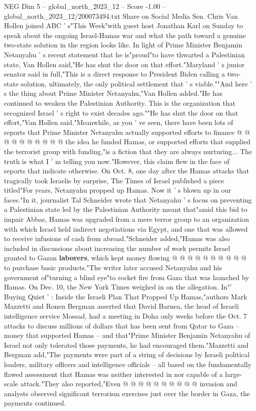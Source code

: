 \begin{textsample}{NEG Dim 5 – global\_north\_2023\_12 – Score -1.00 – global\_north\_2023\_12/200073494.txt}  \label{ex:f5_neg_052}
Share on Social Media Sen.
Chris Van Hollen joined ABC ' s"This Week"with guest host Jonathan Karl on Sunday to speak about the ongoing Israel-Hamas war and what the path toward a genuine two-state solution in the region looks like.
In light of Prime Minister Benjamin Netanyahu ' s recent statement that he is"proud"to have thwarted a Palestinian state, Van Hollen said,"He has shut the door on that effort."Maryland ' s junior senator said in full,"This is a direct response to President Biden calling a two-state solution, ultimately, the only political settlement that ' s viable.""And here ' s the thing about Prime Minister Netanyahu,"Van Hollen added."He has continued to weaken the Palestinian Authority.
This is the organization that recognized Israel ' s right to exist decades ago.""He has shut the door on that effort,"Van Hollen said."Meanwhile, as you ' ve seen, there have been lots of reports that Prime Minister Netanyahu actually supported efforts to finance @ @ @ @ @ @ @ @ @ @ the idea he funded Hamas, or supported efforts that supplied the terrorist group with funding,"is a fiction that they are always nurturing...
The truth is what I ' m telling you now."However, this claim flew in the face of reports that indicate otherwise.
On Oct. 8, one day after the Hamas attacks that tragically took Israelis by surprise, The Times of Israel published a piece titled"For years, Netanyahu propped up Hamas.
Now it ' s blown up in our faces."In it, journalist Tal Schneider wrote that Netanyahu ' s focus on preventing a Palestinian state led by the Palestinian Authority meant that"amid this bid to impair Abbas, Hamas was upgraded from a mere terror group to an organization with which Israel held indirect negotiations via Egypt, and one that was allowed to receive infusions of cash from abroad."Schneider added,"Hamas was also included in discussions about increasing the number of work permits Israel granted to Gazan \textbf{laborers}, which kept money flowing @ @ @ @ @ @ @ @ @ @ to purchase basic products."The writer later accused Netanyahu and his government of"turning a blind eye"to rocket fire from Gaza that was launched by Hamas.
On Dec. 10, the New York Times weighed in on the allegation.
In"' Buying Quiet ' : Inside the Israeli Plan That Propped Up Hamas,"authors Mark Mazzetti and Ronen Bergman asserted that David Barnea, the head of Israeli intelligence service Mossad, had a meeting in Doha only weeks before the Oct. 7 attacks to discuss millions of dollars that has been sent from Qatar to Gaza -- money that supported Hamas -- and that"Prime Minister Benjamin Netanyahu of Israel not only tolerated those payments, he had encouraged them."Mazzetti and Bergman add,"The payments were part of a string of decisions by Israeli political leaders, military officers and intelligence officials -- all based on the fundamentally flawed assessment that Hamas was neither interested in nor capable of a large-scale attack."They also reported,"Even @ @ @ @ @ @ @ @ @ @ invasion and analysts observed significant terrorism exercises just over the border in Gaza, the payments continued.

\end{textsample}
